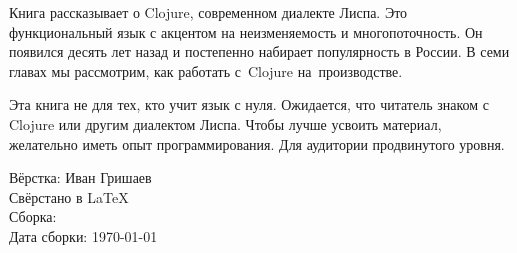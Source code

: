 \thispagestyle{empty}

\small

Книга рассказывает о Clojure, современном диалекте Лиспа. Это функциональный
язык с акцентом на неизменяемость и многопоточность. Он появился десять лет
назад и постепенно набирает популярность в России. В семи главах мы рассмотрим, как
работать с~Clojure на~производстве.

Эта книга не для тех, кто учит язык с нуля. Ожидается, что читатель знаком с
Clojure или другим диалектом Лиспа. Чтобы лучше усвоить материал, желательно
иметь опыт программирования. Для аудитории продвинутого уровня.

\normalfont

\vspace{5em}

\noindent
Вёрстка: Иван Гришаев\\
Свёрстано в \LaTeX\\
Сборка: \commithash \committs\\
Дата сборки: \today

